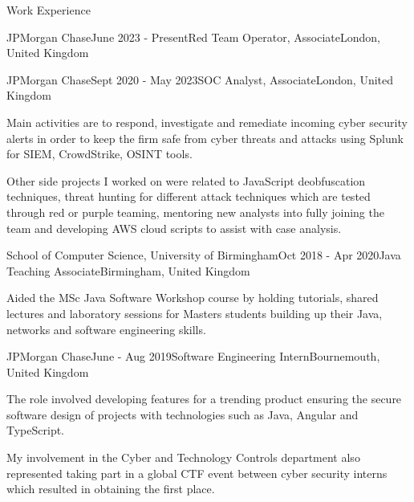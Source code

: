 \documentclass{resume} %
\begin{document}

\begin{rSection}{Work Experience}

\begin{rSubsection}{JPMorgan Chase}{June 2023 - Present}{Red Team Operator, Associate}{London, United Kingdom}
\end{rSubsection}

\begin{rSubsection}{JPMorgan Chase}{Sept 2020 - May 2023}{SOC Analyst, Associate}{London, United Kingdom}
\item Main activities are to respond, investigate and remediate incoming cyber security alerts in order to keep the firm safe from cyber threats and attacks using Splunk for SIEM, CrowdStrike, OSINT tools.
\item Other side projects I worked on were related to JavaScript deobfuscation techniques, threat hunting for different attack techniques which are tested through red or purple teaming, mentoring new analysts into fully joining the team and developing AWS cloud scripts to assist with case analysis.
\end{rSubsection}

\begin{rSubsection}{School of Computer Science, University of Birmingham}{Oct 2018 - Apr 2020}{Java Teaching Associate}{Birmingham, United Kingdom}
\item Aided the MSc Java Software Workshop course by holding tutorials, shared lectures and laboratory sessions for Masters students building up their Java, networks and software engineering skills.
\end{rSubsection}

\begin{rSubsection}{JPMorgan Chase}{June - Aug 2019}{Software Engineering Intern}{Bournemouth, United Kingdom}
\item The role involved developing features for a trending product ensuring the secure software design of projects with technologies such as Java, Angular and TypeScript.
\item My involvement in the Cyber and Technology Controls department also represented taking part in a global CTF event between cyber security interns which resulted in obtaining the first place.
\end{rSubsection}


\end{rSection}
\end{document}
